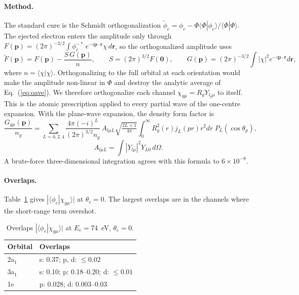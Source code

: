 \documentclass[11pt,a4paper]{article}
\newcommand{\aone}{3a$_1$}
\newcommand{\atwo}{2a$_1$}
\newcommand{\br}{\mathbf r}
\newcommand{\bp}{\mathbf p}
\begin{document}
\paragraph{Method.} The standard cure is the Schmidt orthogonalization
$\tilde\phi_e=\phi_e-\Phi\langle\Phi|\phi_e\rangle/\langle\Phi|\Phi\rangle$. The ejected electron
enters the amplitude only through
$F(\bp)=(2\pi)^{-3/2}\int\phi^{-*}_e\,e^{-i\bp\cdot\br}\chi\,d\br$, so the orthogonalized amplitude
uses
\begin{equation}
\tilde F(\bp)=F(\bp)-\frac{S\,G(\bp)}{n},\qquad S=(2\pi)^{3/2}F(\mathbf0),\qquad
G(\bp)=(2\pi)^{-3/2}\int|\chi|^2e^{-i\bp\cdot\br}d\br,
\end{equation}
where $n=\langle\chi|\chi\rangle$. Orthogonalizing to the full orbital at each orientation would
make the amplitude non-linear in $\Phi$ and destroy the analytic average of Eq.~(\ref{eq:oave}).
We therefore orthogonalize each channel $\chi_{g\mu}=R_gY_{l_g\mu}$ to itself. This is the atomic
prescription applied to every partial wave of the one-centre expansion. With the plane-wave
expansion, the density form factor is
\begin{equation}
\frac{G_{g\mu}(\bp)}{n_g}=\sum_{L=0,2,4}\frac{4\pi(-i)^L}{(2\pi)^{3/2}n_g}\,A_{l\mu L}\sqrt{\tfrac{2L+1}{4\pi}}
\int_0^\infty R_g^2(r)j_L(pr)r^2dr\;P_L(\cos\theta_p),
\end{equation}
\begin{equation}
A_{l\mu L}=\int|Y_{l\mu}|^2Y_{L0}\,d\Omega .
\end{equation}
A brute-force three-dimensional integration agrees with this formula to $6\times10^{-8}$.

\paragraph{Overlaps.} Table~\ref{tab:ovl} gives $|\langle\phi_e|\chi_{g\mu}\rangle|$ at
$\theta_e=0$. The largest overlaps are in the channels where the short-range term overshot.

\begin{table}[H]\centering\small
\caption{Overlaps $|\langle\phi_e|\chi_{g\mu}\rangle|$ at $E_e=74$~eV, $\theta_e=0$.}\label{tab:ovl}
\begin{tabular}{ll}\toprule
Orbital & Overlaps\\\midrule
\atwo & s: 0.37; p, d: $\le0.02$\\
\aone & s: 0.10; p: 0.18--0.20; d: $\le0.01$\\
1e & p: 0.028; d: 0.003--0.03\\\bottomrule
\end{tabular}
\end{table}
\end{document}
